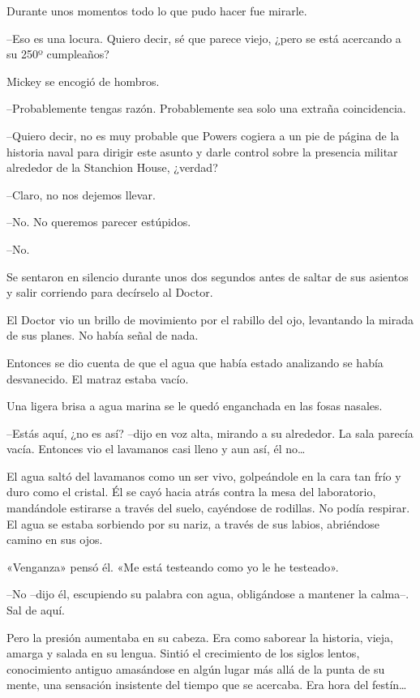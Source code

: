 {Durante unos momentos todo lo que pudo hacer fue mirarle.}

{--Eso es una locura. Quiero decir, sé que parece viejo, ¿pero se está
acercando a su 250º cumpleaños?}

{Mickey se encogió de hombros.}

{--Probablemente tengas razón. Probablemente sea solo una extraña
coincidencia.}

{--Quiero decir, no es muy probable que Powers cogiera a un pie de
 página de la historia naval para dirigir este asunto y darle control
sobre la presencia militar alrededor de la Stanchion House, ¿verdad?}

{--Claro, no nos dejemos llevar.}

{--No. No queremos parecer estúpidos.}

{--No.}

{Se sentaron en silencio durante unos dos segundos antes de saltar de
sus asientos y salir corriendo para decírselo al Doctor.}

\mbox{}

{El Doctor vio un brillo de movimiento por el rabillo del ojo,
levantando la mirada de sus planes. No había señal de nada.}

{Entonces se dio cuenta de que el agua que había estado analizando se
había desvanecido. El matraz estaba vacío.}

{Una ligera brisa a agua marina se le quedó enganchada en las fosas
nasales.}

{--Estás aquí, ¿no es así? --dijo en voz alta, mirando a su alrededor.
 La sala parecía vacía. Entonces vio el lavamanos casi lleno y aun así,
 él no\ldots{}}

{El agua saltó del lavamanos como un ser vivo, golpeándole en la cara
 tan frío y duro como el cristal. Él se cayó hacia atrás contra la mesa
 del laboratorio, mandándole estirarse a través del suelo, cayéndose de
 rodillas. No podía respirar. El agua se estaba sorbiendo por su nariz, a
través de sus labios, abriéndose camino en sus ojos.}

{«Venganza» pensó él. «Me está testeando como yo le he testeado».}

{--No --dijo él, escupiendo su palabra con agua, obligándose a mantener
la calma--. Sal de aquí.}

{Pero la presión aumentaba en su cabeza. Era como saborear la historia,
 vieja, amarga y salada en su lengua. Sintió el crecimiento de los siglos
 lentos, conocimiento antiguo amasándose en algún lugar más allá de la
 punta de su mente, una sensación insistente del tiempo que se acercaba.
 Era hora del festín\ldots{}}

